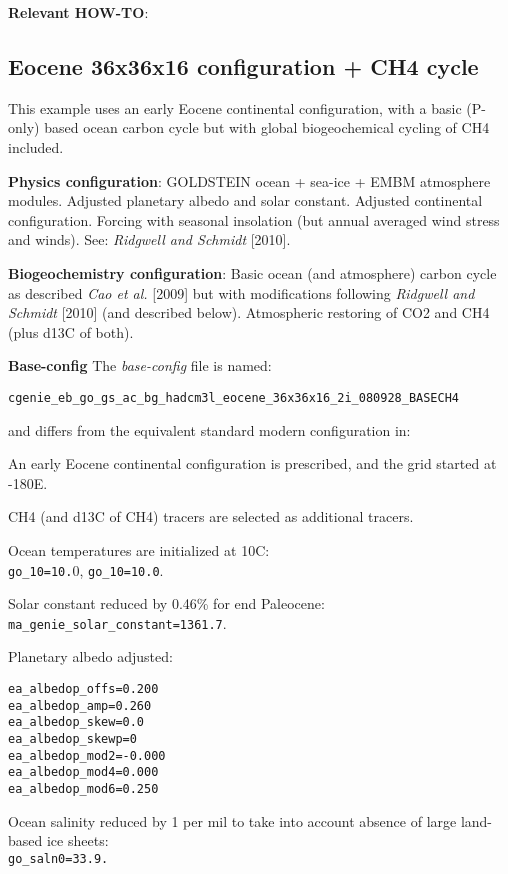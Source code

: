 \documentclass[10pt,twoside]{article}
\begin{document}
\noindent \textbf{Relevant HOW-TO}: 



\subsection{Eocene 36x36x16 configuration + CH4 cycle}\label{EXAMPLE_p0055c_PO4_CH4_SPIN}

This example uses an early Eocene continental configuration, with a basic (P-only) based ocean carbon cycle but with global biogeochemical cycling of CH4 included.

\noindent \textbf{Physics configuration}: GOLDSTEIN ocean + sea-ice + EMBM atmosphere modules. Adjusted planetary albedo and solar constant. Adjusted continental configuration. Forcing with seasonal insolation (but annual averaged wind stress and winds). See: \textit{Ridgwell and Schmidt} [2010].

\noindent \textbf{Biogeochemistry configuration}: Basic ocean (and atmosphere) carbon cycle as described \textit{Cao et al.} [2009] but with modifications following \textit{Ridgwell and Schmidt} [2010] (and described below). Atmospheric restoring of CO2 and CH4 (plus d13C of both).

\noindent \textbf{Base-config} The \textit{base-config} file is named:
\vspace{-10pt}\begin{verbatim}cgenie_eb_go_gs_ac_bg_hadcm3l_eocene_36x36x16_2i_080928_BASECH4 \end{verbatim}\vspace{-10pt}
and differs from the equivalent standard modern configuration in:
	\begin{compactitem}
	\item An early Eocene continental configuration is prescribed, and the grid started at -180E.
		\item CH4 (and d13C of CH4) tracers are selected as additional tracers. 
		\item Ocean temperatures are initialized at 10C:
		\\ \texttt{go\_10=10.}0, \texttt{go\_10=10.0}.
		\item Solar constant reduced by 0.46\% for end Paleocene:
		\\ \texttt{ma\_genie\_solar\_constant=1361.7}.
		\item Planetary albedo adjusted:
		\vspace{-5pt}\begin{verbatim}
ea_albedop_offs=0.200
ea_albedop_amp=0.260
ea_albedop_skew=0.0
ea_albedop_skewp=0
ea_albedop_mod2=-0.000
ea_albedop_mod4=0.000
ea_albedop_mod6=0.250
\end{verbatim}\vspace{-5pt}
\item Ocean salinity reduced by 1 per mil to take into account absence of large land-based ice sheets:
\\ \texttt{go\_saln0=33.9.}
	\end{compactitem}
\end{document}
